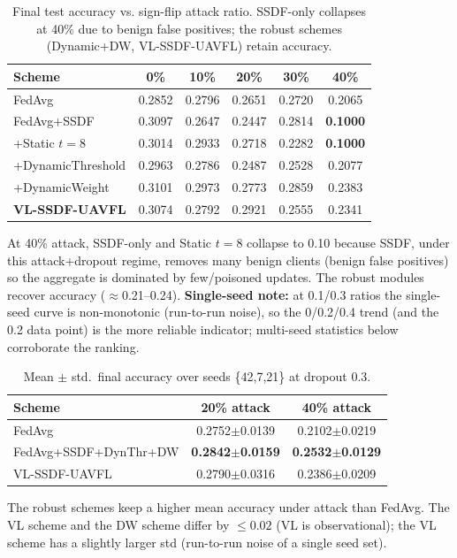 \documentclass[10pt,conference]{IEEEtran}
\begin{document}
\begin{table}[t]
\caption{Final test accuracy vs. sign-flip attack ratio. SSDF-only collapses at 40\% due to benign false positives; the robust schemes (Dynamic+DW, VL-SSDF-UAVFL) retain accuracy.}
\label{tab:attack_curve}
\centering
\small
\begin{tabular}{lccccc}
\toprule
Scheme & 0\% & 10\% & 20\% & 30\% & 40\%\\
\midrule
FedAvg & 0.2852 & 0.2796 & 0.2651 & 0.2720 & 0.2065\\
FedAvg+SSDF & 0.3097 & 0.2647 & 0.2447 & 0.2814 & \textbf{0.1000}\\
+Static $t{=}8$ & 0.3014 & 0.2933 & 0.2718 & 0.2282 & \textbf{0.1000}\\
+DynamicThreshold & 0.2963 & 0.2786 & 0.2487 & 0.2528 & 0.2077\\
+DynamicWeight & 0.3101 & 0.2973 & 0.2773 & 0.2859 & 0.2383\\
\textbf{VL-SSDF-UAVFL} & 0.3074 & 0.2792 & 0.2921 & 0.2555 & 0.2341\\
\bottomrule
\end{tabular}
\end{table}

At 40\% attack, SSDF-only and Static $t{=}8$ collapse to 0.10 because SSDF, under this attack+dropout regime, removes many benign clients (benign false positives) so the aggregate is dominated by few/poisoned updates. The robust modules recover accuracy ($\approx$0.21--0.24). \textbf{Single-seed note:} at 0.1/0.3 ratios the single-seed curve is non-monotonic (run-to-run noise), so the 0/0.2/0.4 trend (and the 0.2 data point) is the more reliable indicator; multi-seed statistics below corroborate the ranking.

\begin{table}[t]
\caption{Mean $\pm$ std.\ final accuracy over seeds \{42,7,21\} at dropout 0.3.}
\label{tab:multiseed}
\centering
\small
\begin{tabular}{lcc}
\toprule
Scheme & 20\% attack & 40\% attack\\
\midrule
FedAvg & 0.2752$\pm$0.0139 & 0.2102$\pm$0.0219\\
FedAvg+SSDF+DynThr+DW & \textbf{0.2842$\pm$0.0159} & \textbf{0.2532$\pm$0.0129}\\
VL-SSDF-UAVFL & 0.2790$\pm$0.0316 & 0.2386$\pm$0.0209\\
\bottomrule
\end{tabular}
\end{table}

The robust schemes keep a higher mean accuracy under attack than FedAvg. The VL scheme and the DW scheme differ by $\le 0.02$ (VL is observational); the VL scheme has a slightly larger std (run-to-run noise of a single seed set).
\end{document}
